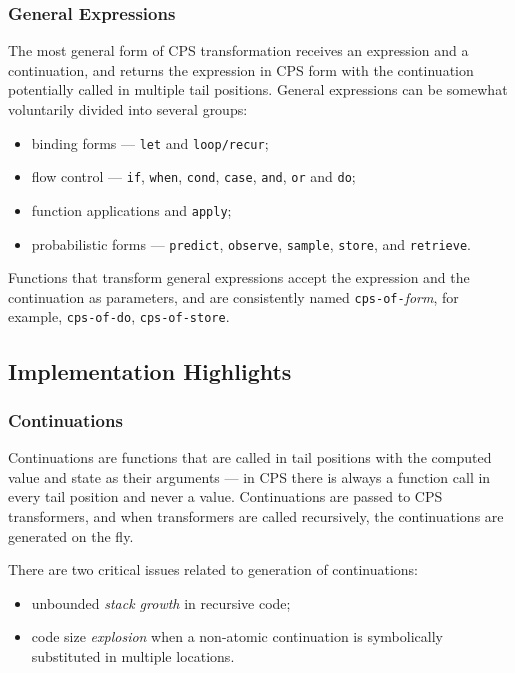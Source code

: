 \documentclass[preprint]{sigplanconf}
\begin{document}
\subsubsection{General Expressions}

The most general form of CPS transformation receives an
expression and a continuation, and returns the expression
in CPS form with the continuation potentially called in multiple
tail positions. General expressions can be somewhat voluntarily
divided into several groups:
\begin{itemize}
    \item binding forms --- \texttt{let} and
        \texttt{loop/recur};
    \item flow control --- \texttt{if}, \texttt{when},
        \texttt{cond}, \texttt{case}, \texttt{and}, \texttt{or} and \texttt{do};
    \item function applications and \texttt{apply};
    \item probabilistic forms --- \texttt{predict},
        \texttt{observe}, \texttt{sample}, \texttt{store}, and \texttt{retrieve}.
\end{itemize}
Functions that transform general expressions accept the
expression and the continuation as parameters, and are
consistently named \texttt{cps-of-}\textit{form}, for example,
\texttt{cps-of-do}, \texttt{cps-of-store}.

\subsection{Implementation Highlights}

\subsubsection{Continuations}

Continuations are functions that are called in tail positions
with the computed value and state as their arguments --- in CPS
there is always a function call in every tail position and never
a value. Continuations are passed to CPS transformers, and when
transformers are called recursively, the continuations are
generated on the fly. 

There are two critical issues related to generation of
continuations:
\begin{itemize}
    \item unbounded \textit{stack growth} in recursive code;
    \item code size \textit{explosion} when a non-atomic
        continuation is symbolically substituted in multiple
        locations.
\end{itemize}
        
\end{document}
